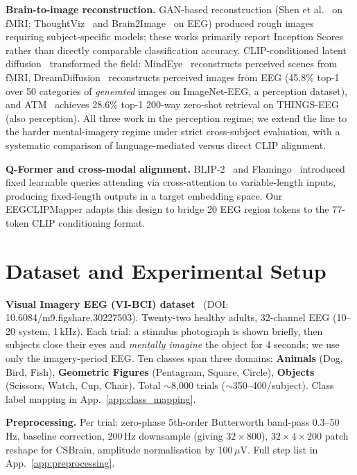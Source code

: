\documentclass{article}
\begin{document}
\textbf{Brain-to-image reconstruction.} GAN-based reconstruction (Shen et al.~\citep{shen2019end} on fMRI; ThoughtViz~\citep{tirupattur2018thoughtviz} and Brain2Image~\citep{kavasidis2017brain2image} on EEG) produced rough images requiring subject-specific models; these works primarily report Inception Scores rather than directly comparable classification accuracy. CLIP-conditioned latent diffusion~\citep{rombach2022ldm,radford2021clip} transformed the field: MindEye~\citep{scotti2024mindeye} reconstructs perceived scenes from fMRI, DreamDiffusion~\citep{bai2023dreamdiffusion} reconstructs perceived images from EEG (45.8\% top-1 over 50 categories of \emph{generated} images on ImageNet-EEG, a perception dataset), and ATM~\citep{li2024atm} achieves 28.6\% top-1 200-way zero-shot retrieval on THINGS-EEG (also perception). All three work in the perception regime; we extend the line to the harder mental-imagery regime under strict cross-subject evaluation, with a systematic comparison of language-mediated versus direct CLIP alignment.

\textbf{Q-Former and cross-modal alignment.} BLIP-2~\citep{li2023blip2} and Flamingo~\citep{alayrac2022flamingo} introduced fixed learnable queries attending via cross-attention to variable-length inputs, producing fixed-length outputs in a target embedding space. Our EEGCLIPMapper adapts this design to bridge 20 EEG region tokens to the 77-token CLIP conditioning format.

\section{Dataset and Experimental Setup}
\label{sec:dataset}

\textbf{Visual Imagery EEG (VI-BCI) dataset}~\citep{figshare_eeg,figshare_paper} (DOI: 10.6084/m9.figshare.30227503). Twenty-two healthy adults, 32-channel EEG (10--20 system, 1\,kHz). Each trial: a stimulus photograph is shown briefly, then subjects close their eyes and \emph{mentally imagine} the object for 4 seconds; we use only the imagery-period EEG. Ten classes span three domains: \textbf{Animals} (Dog, Bird, Fish), \textbf{Geometric Figures} (Pentagram, Square, Circle), \textbf{Objects} (Scissors, Watch, Cup, Chair). Total $\sim$8{,}000 trials ($\sim$350--400/subject). Class label mapping in App.~\ref{app:class_mapping}.

\textbf{Preprocessing.} Per trial: zero-phase 5th-order Butterworth band-pass 0.3--50\,Hz, baseline correction, 200\,Hz downsample (giving $32{\times}800$), $32{\times}4{\times}200$ patch reshape for CSBrain, amplitude normalisation by 100\,$\mu$V. Full step list in App.~\ref{app:preprocessing}.
\end{document}
